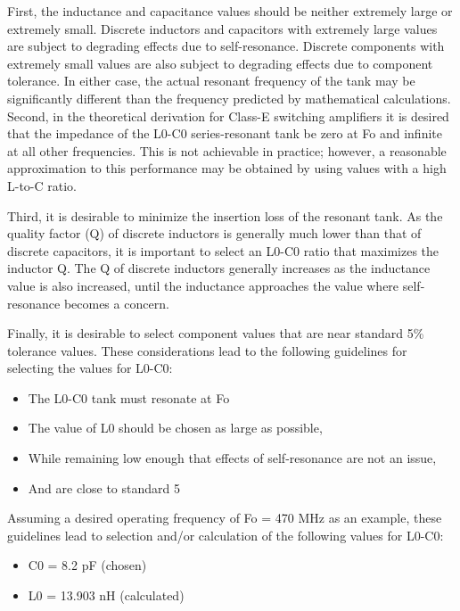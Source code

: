         First, the inductance and capacitance values should be neither extremely large or extremely small. 
        Discrete inductors and capacitors with extremely large values are subject to degrading effects due 
        to self-resonance. Discrete components with extremely small values are also subject to degrading 
        effects due to component tolerance. In either case, the actual resonant frequency of the tank may 
        be significantly different than the frequency predicted by mathematical calculations.
        Second, in the theoretical derivation for Class-E switching amplifiers it is desired that the 
        impedance of the L0-C0 series-resonant tank be zero at Fo and infinite at all other frequencies. 
        This is not achievable in practice; however, a reasonable approximation to this performance may be 
        obtained by using values with a high L-to-C ratio.
        
        Third, it is desirable to minimize the insertion loss of the resonant tank. As the quality factor 
        (Q) of discrete inductors is generally much lower than that of discrete capacitors, it is important 
        to select an L0-C0 ratio that maximizes the inductor Q. The Q of discrete inductors generally 
        increases as the inductance value is also increased, until the inductance approaches the value 
        where self-resonance becomes a concern.
        
        Finally, it is desirable to select component values that are near standard 5\% tolerance values. 
        These considerations lead to the following guidelines for selecting the values for L0-C0:
        \begin{itemize}
          \item The L0-C0 tank must resonate at Fo
          \item The value of L0 should be chosen as large as possible,
          \item While remaining low enough that effects of self-resonance are not an issue,
          \item And are close to standard 5%
        \end{itemize}
        
        Assuming a desired operating frequency of Fo = 470 MHz as an example, these guidelines lead to 
        selection and/or calculation of the following values for L0-C0:
        \begin{itemize}
          \item C0 = 8.2 pF (chosen)
          \item L0 = 13.903 nH (calculated)
        \end{itemize}
        

